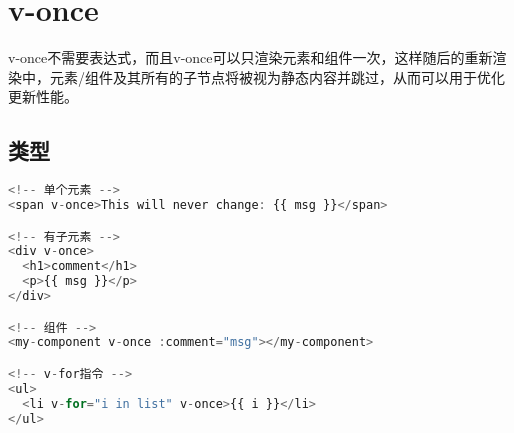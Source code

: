 \begin{lstlisting}[language=JavaScript]

\end{lstlisting}




\begin{lstlisting}[language=JavaScript]

\end{lstlisting}




\begin{lstlisting}[language=JavaScript]

\end{lstlisting}




\begin{lstlisting}[language=JavaScript]

\end{lstlisting}




\begin{lstlisting}[language=JavaScript]

\end{lstlisting}




\begin{lstlisting}[language=JavaScript]

\end{lstlisting}




\begin{lstlisting}[language=JavaScript]

\end{lstlisting}

\chapter{v-once}

v-once不需要表达式，而且v-once可以只渲染元素和组件一次，这样随后的重新渲染中，元素/组件及其所有的子节点将被视为静态内容并跳过，从而可以用于优化更新性能。

\section{类型}


\begin{lstlisting}[language=JavaScript]
<!-- 单个元素 -->
<span v-once>This will never change: {{ msg }}</span>

<!-- 有子元素 -->
<div v-once>
  <h1>comment</h1>
  <p>{{ msg }}</p>
</div>

<!-- 组件 -->
<my-component v-once :comment="msg"></my-component>

<!-- v-for指令 -->
<ul>
  <li v-for="i in list" v-once>{{ i }}</li>
</ul>
\end{lstlisting}




